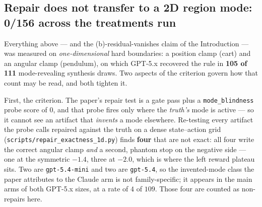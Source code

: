 \documentclass[11pt]{article}
\theoremstyle{definition}
\theoremstyle{remark}
\begin{document}
\subsection{Repair does not transfer to a 2D region mode: 0/156 across the treatments run}
\label{sec:patch2d-synthesis}

Everything above --- and the (b)-residual-vanishes claim of the Introduction --- was measured on \emph{one-dimensional} hard boundaries: a position clamp (cart) and an angular clamp (pendulum), on which GPT-5.x recovered the rule in \textbf{105 of 111} mode-revealing synthesis draws. Two aspects of the criterion govern how that count may be read, and both tighten it.

First, the criterion. The paper's repair test is a gate pass plus a \texttt{mode\_blindness} probe score of $0$, and that probe fires only where the \emph{truth's} mode is active --- so it cannot see an artifact that \emph{invents} a mode elsewhere. Re-testing every artifact the probe calls repaired against the truth on a dense state--action grid (\texttt{scripts/\allowbreak repair\_\allowbreak exactness\_\allowbreak 1d.py}) finds \textbf{four} that are not exact: all four write the correct angular clamp \emph{and} a second, phantom stop on the negative side --- one at the symmetric $-1.4$, three at $-2.0$, which is where the left reward plateau sits. Two are \texttt{gpt-5.4-mini} and two are \texttt{gpt-5.4}, so the invented-mode class the paper attributes to the Claude arm is not family-specific; it appears in the main arms of both GPT-5.x sizes, at a rate of $4$ of $109$. Those four are counted as non-repairs here.
\end{document}
